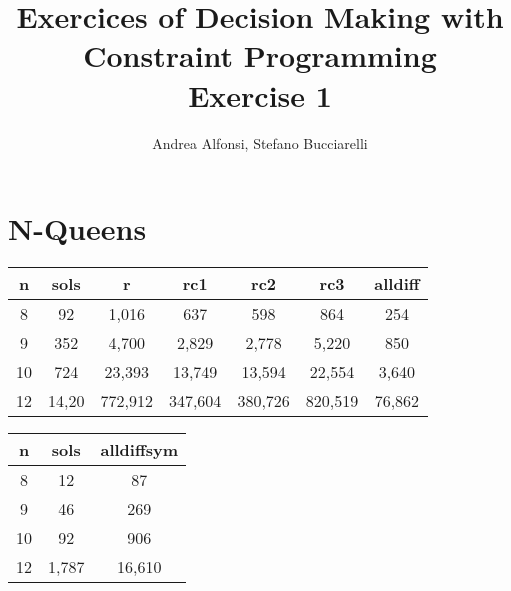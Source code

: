 \documentclass{article}
\title{Exercices of Decision Making with Constraint Programming\\  Exercise 1}
\author{Andrea Alfonsi, Stefano Bucciarelli}
\begin{document}
\maketitle

\section{N-Queens}


\begin{tabular}{||c c c c c c c||} 
 \hline
 n & sols & r & rc1 & rc2 & rc3 & alldiff \\ 
 \hline\hline
 8 &	92 & 1,016 & 637 & 598 & 864 & 254 \\ 
 \hline
 9 & 352 & 4,700	& 2,829	& 2,778	& 5,220 & 850 \\
 \hline
 10 & 724 & 23,393 & 13,749 & 13,594 & 22,554 & 3,640 \\
 \hline
 12 & 14,20 & 772,912 & 347,604 & 380,726 & 820,519	& 76,862 \\
 \hline
\end{tabular}
\newline
\newline

\begin{tabular}{||c c c ||} 
 \hline
 n & sols & alldiffsym \\ 
 \hline\hline
 8 & 12 & 87 \\ 
 \hline
 9 & 46 & 269 \\ 
 \hline
 10 & 92 & 906 \\ 
 \hline
 12 & 1,787  & 16,610 \\ 
 \hline
\end{tabular}
\newline
\newline
\end{document}

